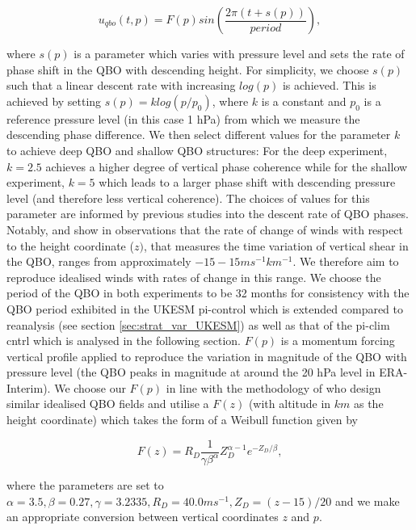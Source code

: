 \begin{equation} \label{eq:imposed_U}
u_{qbo}(t, p) = F(p) sin(\frac{2\pi (t + s(p))}{period}),
\end{equation}

\noindent where $s(p)$ is a parameter which varies with pressure level and sets the rate of phase shift in the QBO with descending height. For simplicity, we choose $s(p)$ such that a linear descent rate with increasing $log(p)$ is achieved. This is achieved by setting $s(p) = k log(p/p_{0})$, where $k$ is a constant and $p_{0}$ is a reference pressure level (in this case 1 hPa) from which we measure the descending phase difference. We then select different values for the parameter $k$ to achieve deep QBO and shallow QBO structures: For the deep experiment, $k = 2.5$ achieves a higher degree of vertical phase coherence while for the shallow experiment, $k = 5$ which leads to a larger phase shift with descending pressure level (and therefore less vertical coherence). The choices of values for this parameter are informed by previous studies into the descent rate of QBO phases. Notably, \cite{kinnersleyDescent1996} and \cite{coySeasonal2020} show in observations that the rate of change of winds with respect to the height coordinate ($z)$, that measures the time variation of vertical shear in the QBO, ranges from approximately $-15-15ms^{-1}km^{-1}$. We therefore aim to reproduce idealised winds with rates of change in this range. We choose the period of the QBO in both experiments to be 32 months for consistency with the QBO period exhibited in the UKESM pi-control which is extended compared to reanalysis (see section \ref{sec:strat_var_UKESM}) as well as that of the pi-clim cntrl which is analysed in the following section. $F(p)$ is a momentum forcing vertical profile applied to reproduce the variation in magnitude of the QBO with pressure level (the QBO peaks in magnitude at around the 20 hPa level in ERA-Interim). We choose our $F(p)$ in line with the methodology of \cite{pascoeQuasibiennial2005b} who design similar idealised QBO fields and utilise a $F(z)$ (with altitude in $km$ as the height coordinate) which takes the form of a Weibull function given by

\begin{equation} \label{eq:vertical_profile}
F(z) = R_D \frac{1}{\gamma \beta^\alpha}  Z_D^{\alpha-1}  e^{-Z_D/\beta},
\end{equation}

\noindent where the parameters are set to $\alpha = 3.5, \beta = 0.27, \gamma = 3.2335, R_D = 40.0 ms^{-1}, Z_{D} = (z - 15)/20$ and we make an appropriate conversion between vertical coordinates $z$ and $p$.

